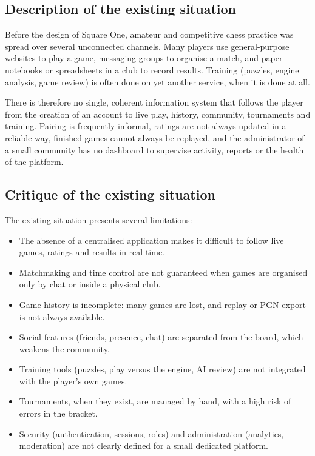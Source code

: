 \documentclass[12pt,a4paper,oneside]{report}
\begin{document}
\subsection{Description of the existing situation}
Before the design of Square One, amateur and competitive chess practice was spread over several unconnected channels. Many players use general-purpose websites to play a game, messaging groups to organise a match, and paper notebooks or spreadsheets in a club to record results. Training (puzzles, engine analysis, game review) is often done on yet another service, when it is done at all.

There is therefore no single, coherent information system that follows the player from the creation of an account to live play, history, community, tournaments and training. Pairing is frequently informal, ratings are not always updated in a reliable way, finished games cannot always be replayed, and the administrator of a small community has no dashboard to supervise activity, reports or the health of the platform.

\subsection{Critique of the existing situation}
The existing situation presents several limitations:
\begin{itemize}[leftmargin=1.4em,itemsep=0.35em]
  \item The absence of a centralised application makes it difficult to follow live games, ratings and results in real time.
  \item Matchmaking and time control are not guaranteed when games are organised only by chat or inside a physical club.
  \item Game history is incomplete: many games are lost, and replay or PGN export is not always available.
  \item Social features (friends, presence, chat) are separated from the board, which weakens the community.
  \item Training tools (puzzles, play versus the engine, AI review) are not integrated with the player's own games.
  \item Tournaments, when they exist, are managed by hand, with a high risk of errors in the bracket.
  \item Security (authentication, sessions, roles) and administration (analytics, moderation) are not clearly defined for a small dedicated platform.
\end{itemize}
\end{document}
